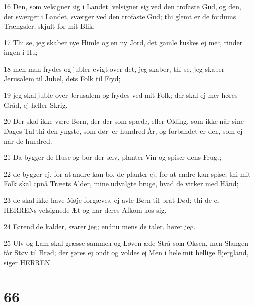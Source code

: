 \par 16 Den, som velsigner sig i Landet, velsigner sig ved den trofaste Gud, og den, der sværger i Landet, sværger ved den trofaste Gud; thi glemt er de fordums Trængsler, skjult for mit Blik.
\par 17 Thi se, jeg skaber nye Himle og en ny Jord, det gamle huskes ej mer, rinder ingen i Hu;
\par 18 men man frydes og jubler evigt over det, jeg skaber, thi se, jeg skaber Jerusalem til Jubel, dets Folk til Fryd;
\par 19 jeg skal juble over Jerusalem og frydes ved mit Folk; der skal ej mer høres Gråd, ej heller Skrig.
\par 20 Der skal ikke være Børn, der dør som spæde, eller Olding, som ikke når sine Dages Tal thi den yngste, som dør, er hundred År, og forbandet er den, som ej når de hundred.
\par 21 Da bygger de Huse og bor der selv, planter Vin og spiser dens Frugt;
\par 22 de bygger ej, for at andre kan bo, de planter ej, for at andre kan spise; thi mit Folk skal opnå Træets Alder, mine udvalgte bruge, hvad de virker med Hånd;
\par 23 de skal ikke have Møje forgæves, ej avle Børn til brat Død; thi de er HERRENs velsignede Æt og har deres Afkom hos sig.
\par 24 Førend de kalder, svarer jeg; endnu mens de taler, hører jeg.
\par 25 Ulv og Lam skal græsse sammen og Løven æde Strå som Oksen, men Slangen får Støv til Brød; der gøres ej ondt og voldes ej Men i hele mit hellige Bjergland, siger HERREN.

\chapter{66}

